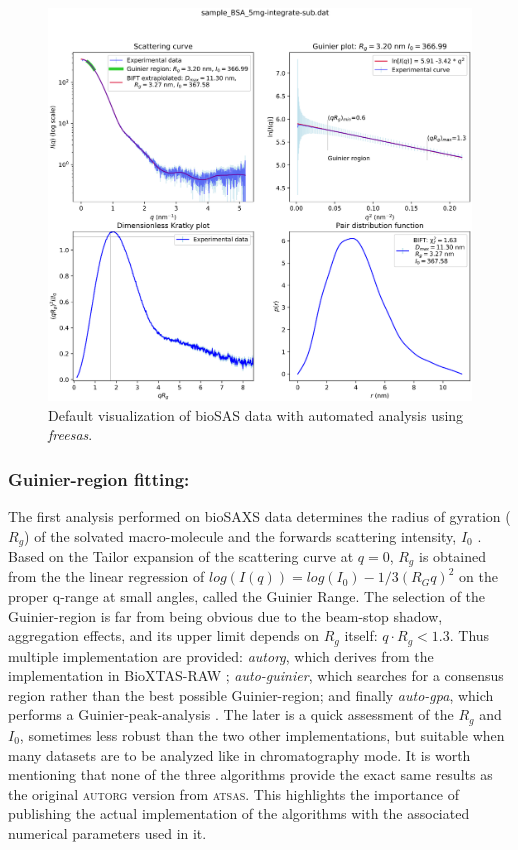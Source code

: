 \documentclass[preprint]{iucr}              %
\begin{document}
\begin{figure}
\label{plot}
\includegraphics[width=12cm]{Figure_1.eps}
\caption{Default visualization of bioSAS data with automated analysis using \textit{freesas}.}
\end{figure}

\subsubsection{Guinier-region fitting:}
The first analysis performed on bioSAXS data determines the radius of gyration ($R_g$) of the solvated macro-molecule and the forwards scattering intensity, $I_0$ \cite{guinier}.
Based on the Tailor expansion of the scattering curve at $q=0$, $R_g$ is obtained from the the linear regression of $log(I(q)) = log(I_0)-1/3 (R_{G}q)^{2}$ on the proper q-range at small angles, called the Guinier Range.
The selection of the Guinier-region is far from being obvious due to the beam-stop shadow, aggregation effects, and its upper limit depends on $R_g$ itself: $q \cdot R_g<1.3$.
Thus multiple implementation are provided: \textit{autorg}, which derives from the implementation in BioXTAS-RAW \cite{bioxtasraw}; \textit{auto-guinier}, which searches for a consensus region rather than the best possible Guinier-region; and finally \textit{auto-gpa}, which performs a Guinier-peak-analysis \cite{gpa}. 
The later is a quick assessment of the $R_g$ and $I_0$, sometimes less robust than the two other implementations, but suitable when many datasets are to be analyzed like in chromatography mode.
It is worth mentioning that none of the three algorithms provide the exact same results as the original \textsc{autorg} \cite{ATSAS2} version from \textsc{atsas}. 
This highlights the importance of publishing the actual implementation of the algorithms with the associated numerical parameters used in it.
  
\end{document}
